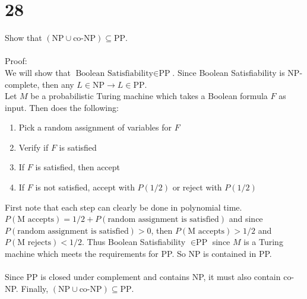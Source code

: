 \documentclass[letterpaper,notitlepage,twoside]{article}
\begin{document}
\section*{28}
Show that $\left(\text{NP}\cup\text{co-NP}\right)\subseteq\text{PP}$.
\\\\
Proof:
\\
We will show that $\text{Boolean Satisfiability}\in\text{PP}$. Since Boolean Satisfiability is NP-complete, then any $L \in \text{NP} \rightarrow L \in \text{PP}$.
\\
Let $M$ be a probabilistic Turing machine which takes a Boolean formula $F$ as input. Then does the following:
\begin{enumerate}
\item Pick a random assignment of variables for $F$
\item Verify if $F$ is satisfied
\item If $F$ is satisfied, then accept
\item If $F$ is not satisfied, accept with $P(1/2)$ or reject with $P(1/2)$
\end{enumerate}
First note that each step can clearly be done in polynomial time. $P(\text{M accepts}) = 1/2 + P(\text{random assignment is satisfied})$ and since $P(\text{random assignment is satisfied}) > 0$, then $P(\text{M accepts}) > 1/2$ and $P(\text{M rejects}) < 1/2$. Thus Boolean Satisfiability $\in \text{PP}$ since $M$ is a Turing machine which meets the requirements for PP. So NP is contained in PP.
\\\\
Since PP is closed under complement and contains NP, it must also contain co-NP. Finally, $\left(\text{NP}\cup\text{co-NP}\right)\subseteq\text{PP}$.
\end{document}
